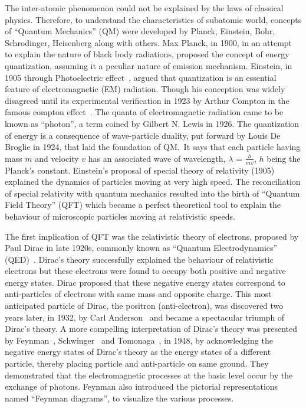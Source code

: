 The inter-atomic phenomenon could not be explained by the laws of classical physics. Therefore, to understand the characteristics of subatomic world,
concepts of ``Quantum Mechanics'' (QM) were developed by Planck, Einstein, Bohr, Schrodinger, Heisenberg along
with others. Max Planck, in 1900, in an attempt to explain the nature of
black body radiations, proposed the concept of energy quantization, assuming it a peculiar nature of emission mechanism. Einstein, in 1905 through Photoelectric
effect~\cite{Einstein:photo}, argued that quantization is an essential feature of electromagnetic (EM) radiation.
Though his conception was widely disagreed until its
experimental verification in 1923 by Arthur Compton in the famous compton effect~\cite{Compton:1923zz}.
The quanta of electromagnetic radiation came to be known as ``photon'', a term
coined by Gilbert N. Lewis in 1926. The quantization of energy is a consequence of wave-particle duality, put forward by Louis De Broglie in 1924, that
laid the foundation of QM.\ It says that each particle having mass $m$ and velocity $v$ has an associated wave of wavelength,
$\lambda$ = $\frac{h}{mv}$, $h$ being the Planck's constant. Einstein's proposal of special theory of relativity (1905)~\cite{Einstein:1905ve} explained the dynamics of
particles moving at very high speed. The reconciliation of special relativity with quantum mechanics resulted into the birth of ``Quantum Field Theory'' (QFT) which
became a perfect theoretical tool to explain the behaviour of microscopic particles moving at relativistic speeds.

The first implication of QFT was the
relativistic theory of electrons, proposed by Paul Dirac in late 1920s, commonly known as ``Quantum Electrodynamics'' (QED)~\cite{Dirac1927}. Dirac's theory successfully
explained the behaviour of relativistic electrons but these electrons were
found to occupy both positive and negative energy states. Dirac proposed that these negative energy states correspond to anti-particles of electrons with same mass
and opposite charge. This most anticipated particle of Dirac, the positron (anti-electron), was discovered two years later, in 1932, by
Carl Anderson~\cite{Anderson:1933mb} and became a spectacular triumph of Dirac's theory. A more compelling interpretation of Dirac's theory was presented by
Feynman~\cite{Feynman:1948ur,Feynman:1948km,Feynman:1949hz}, Schwinger~\cite{Schwinger:1948iu,Schwinger:1948yk} and Tomonaga~\cite{Tomonaga:1948zz}, in 1948,
by acknowledging the negative energy states of Dirac's theory as the energy states of a different particle, thereby placing particle and anti-particle
on same ground. They demonstrated that the electromagnetic processes at the basic level occur by the exchange of photons. Feynman also introduced the pictorial
representations named ``Feynman diagrams'', to visualize the various processes. 

